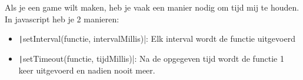 Als je een game wilt maken, heb je vaak een manier nodig om tijd mij te houden.
In javascript heb je 2 manieren:
\begin{itemize}
    \item \texttt|setInterval(functie, intervalMillis)|: Elk
        interval wordt de functie uitgevoerd
    \item \texttt|setTimeout(functie, tijdMillis)|: Na de
        opgegeven tijd wordt de functie 1 keer uitgevoerd en nadien nooit meer.
\end{itemize}

